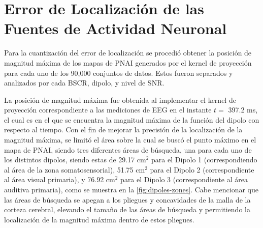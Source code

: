 \section{Error de Localización de las Fuentes de Actividad Neuronal}
\label{sec:methodology:estimator}

Para la cuantización del error de localización se procedió obtener la posición de magnitud máxima de los mapas de PNAI generados por el kernel de proyección para cada uno de los 90,000 conjuntos de datos. 
Estos fueron separados y analizados por cada BSCR, dipolo, y nivel de SNR.

La posición de magnitud máxima fue obtenida al implementar el kernel de proyección correspondiente a las mediciones de EEG en el instante $t=$ 397.2 ms, el cual es en el que se encuentra la magnitud máxima de la función del dipolo con respecto al tiempo.
Con el fin de mejorar la precisión de la localización de la magnitud máxima, se limitó el área sobre la cual se buscó el punto máximo en el mapa de PNAI, siendo tres diferentes áreas de búsqueda, una para cada uno de los distintos dipolos, siendo estas de 29.17 cm$^2$ para el Dipolo 1 (correspondiendo al área de la zona somatosensorial), 51.75 cm$^2$ para el Dipolo 2 (correspondiente al área visual primaria), y 76.92 cm$^2$ para el Dipolo 3 (correspondiente al área auditiva primaria), como se muestra en la \cref{fig:dipoles-zones}.
Cabe mencionar que las áreas de búsqueda se apegan a los pliegues y concavidades de la malla de la corteza cerebral, elevando el tamaño de las áreas de búsqueda y permitiendo la localización de la magnitud máxima dentro de estos pliegues.

